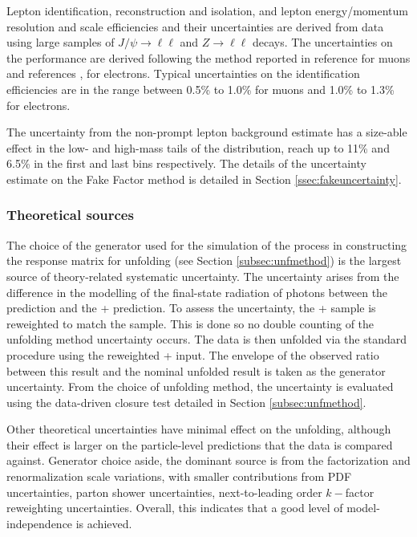 Lepton identification, reconstruction and isolation, and lepton energy/momentum resolution and scale efficiencies and their uncertainties are derived from data using large samples of $J/\psi\rightarrow\ell\ell$ and $Z\rightarrow\ell\ell$ decays. The uncertainties on the performance are derived following the method reported in reference \cite{ATLAS_muon_reco_2016} for muons and references \cite{ATLAS_electron_efficiency_2015-2017}, \cite{ATLAS_electron_efficiency_2015-2016} for electrons. Typical uncertainties on the identification efficiencies are in the range between 0.5\% to 1.0\% for muons and 1.0\% to 1.3\% for electrons. 

The uncertainty from the non-prompt lepton background estimate has a size-able effect in the low- and high-mass tails of the \mFourL distribution, reach up to 11\% and 6.5\% in the first and last bins respectively. The details of the uncertainty estimate on the Fake Factor method is detailed in Section \ref{ssec:fakeuncertainty}.

\subsubsection{Theoretical sources}
The choice of the generator used for the simulation of the \qqFourL{} process in constructing the response matrix for unfolding (see Section \ref{subsec:unfmethod}) is the largest source of theory-related systematic uncertainty. The uncertainty arises from the difference in the modelling of the final-state radiation of photons between the \SHERPA{} prediction and the \POWHEG{} + \pythia{} prediction. To assess the uncertainty, the \POWHEG{} + \pythia{} sample is reweighted to match the \SHERPA{} sample. This is done so no double counting of the unfolding method uncertainty occurs. The data is then unfolded via the standard procedure using the reweighted \POWHEG{} + \pythia{} input. The envelope of the observed ratio between this result and the nominal unfolded result is taken as the generator uncertainty. From the choice of unfolding method, the uncertainty is evaluated using the data-driven closure test detailed in Section \ref{subsec:unfmethod}. 

Other theoretical uncertainties have minimal effect on the unfolding, although their effect is larger on the particle-level predictions that the data is compared against. Generator choice aside, the dominant source is from the factorization and renormalization scale variations, with smaller contributions from PDF uncertainties, parton shower uncertainties, next-to-leading order $k-$factor reweighting uncertainties. Overall, this indicates that a good level of model-independence is achieved.

